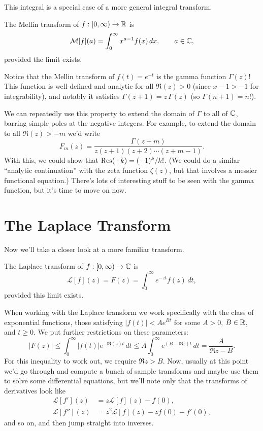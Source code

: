 \documentclass[../m136main.tex]{subfiles}
\begin{document}
This integral is a special case of a more general integral transform.

\begin{definition}
    The Mellin transform of $f : [0, \infty) \to \mathbb{R}$ is
    \[ \mathcal M[f](a) = \int_{0}^{\infty} x^{a - 1} f(x) \,dx, \qquad a \in \mathbb{C}, \]
    provided the limit exists.
\end{definition}

Notice that the Mellin transform of $f(t) = e^{-t}$ is the gamma function $\Gamma(z)$!
This function is well-defined and analytic for all $\Re(z) > 0$ (since $x-1 > -1$ for integrability), and notably it satisfies $\Gamma(z+1) = z \, \Gamma(z)$ (so $\Gamma(n+1) = n!$).

We can repeatedly use this property to extend the domain of $\Gamma$ to all of $\mathbb{C}$, barring simple poles at the negative integers.
For example, to extend the domain to all $\Re(z) > -m$ we'd write
\[ F_m(z) = \frac{\Gamma(z+m)}{z(z+1)(z+2) \cdots (z+m-1)}. \]
With this, we could show that $\operatorname{Res}(-k) = (-1)^{k} / k!$.
(We could do a similar ``analytic continuation'' with the zeta function $\zeta(z)$, but that involves a messier functional equation.)
There's lots of interesting stuff to be seen with the gamma function, but it's time to move on now.

\section{The Laplace Transform}
Now we'll take a closer look at a more familiar transform.

\begin{definition}
    The Laplace transform of $f : [0,\infty) \to \mathbb{C}$ is
    \[ \mathcal L[f](z) = F(z) = \int_{0}^{\infty} e^{-zt} f(z) \,dt, \]
    provided this limit exists.
\end{definition}

When working with the Laplace transform we work specifically with the class of exponential functions, those satisfying $|f(t)| < A e^{Bt}$ for some $A > 0$, $B \in \mathbb{R}$, and $t \geq 0$.
We put further restrictions on these parameters:
\[ |F(z)| \leq \int_{0}^{\infty} |f(t)| e^{-\Re(z) t} \,dt \leq A \int_{0}^{\infty} e^{(B - \Re z)t} \,dt = \frac{A}{\Re z - B}. \]
For this inequality to work out, we require $\Re z > B$.
Now, usually at this point we'd go through and compute a bunch of sample transforms and maybe use them to solve some differential equations, but we'll note only that the transforms of derivatives look like
\begin{align*}
    \mathcal L[f'] (z) &= z \mathcal L[f](z) - f(0), \\
    \mathcal L[f''] (z) &= z^2 \mathcal L[f](z) - z f(0) - f'(0),
\end{align*}
and so on, and then jump straight into inverses.
\end{document}
